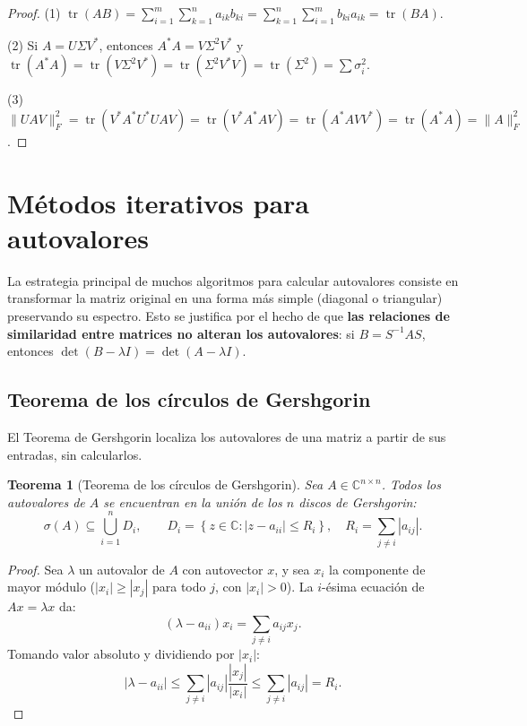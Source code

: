 \documentclass[a4paper,11pt]{report}
\newtheorem{theorem}{Teorema}[chapter]
\begin{document}
\begin{proof}
(1) $\operatorname{tr}(AB) = \sum_{i=1}^m \sum_{k=1}^n a_{ik} b_{ki} = \sum_{k=1}^n \sum_{i=1}^m b_{ki} a_{ik} = \operatorname{tr}(BA)$.

(2) Si $A = U\Sigma V^*$, entonces $A^*A = V\Sigma^2 V^*$ y $\operatorname{tr}(A^*A) = \operatorname{tr}(V\Sigma^2 V^*) = \operatorname{tr}(\Sigma^2 V^*V) = \operatorname{tr}(\Sigma^2) = \sum \sigma_i^2$.

(3) $\|UAV\|_F^2 = \operatorname{tr}(V^*A^*U^*UAV) = \operatorname{tr}(V^*A^*AV) = \operatorname{tr}(A^*AVV^*) = \operatorname{tr}(A^*A) = \|A\|_F^2$.
\end{proof}



\section{Métodos iterativos para autovalores}

La estrategia principal de muchos algoritmos para calcular autovalores consiste en transformar la matriz original en una forma más simple (diagonal o triangular) preservando su espectro. Esto se justifica por el hecho de que \textbf{las relaciones de similaridad entre matrices no alteran los autovalores}: si $B = S^{-1} A S$, entonces $\det(B - \lambda I) = \det(A - \lambda I)$.

\subsection{Teorema de los círculos de Gershgorin}

El Teorema de Gershgorin localiza los autovalores de una matriz a partir de sus entradas, sin calcularlos.

\begin{theorem}[Teorema de los círculos de Gershgorin]\label{thm:gershgorin}
Sea $A \in \mathbb{C}^{n \times n}$. Todos los autovalores de $A$ se encuentran en la unión de los $n$ discos de Gershgorin:
\[
\sigma(A) \subseteq \bigcup_{i=1}^n D_i,
\qquad
D_i = \left\{ z \in \mathbb{C} : |z - a_{ii}| \leq R_i \right\},
\quad R_i = \sum_{j \neq i} |a_{ij}|.
\]
\end{theorem}

\begin{proof}
Sea $\lambda$ un autovalor de $A$ con autovector $x$, y sea $x_i$ la componente de mayor módulo ($|x_i| \geq |x_j|$ para todo $j$, con $|x_i|>0$).
La $i$-ésima ecuación de $Ax = \lambda x$ da:
\[
(\lambda - a_{ii}) x_i = \sum_{j \neq i} a_{ij} x_j.
\]
Tomando valor absoluto y dividiendo por $|x_i|$:
\[
|\lambda - a_{ii}| \leq \sum_{j \neq i} |a_{ij}| \frac{|x_j|}{|x_i|} \leq \sum_{j \neq i} |a_{ij}| = R_i.
\]
\end{proof}
\end{document}

